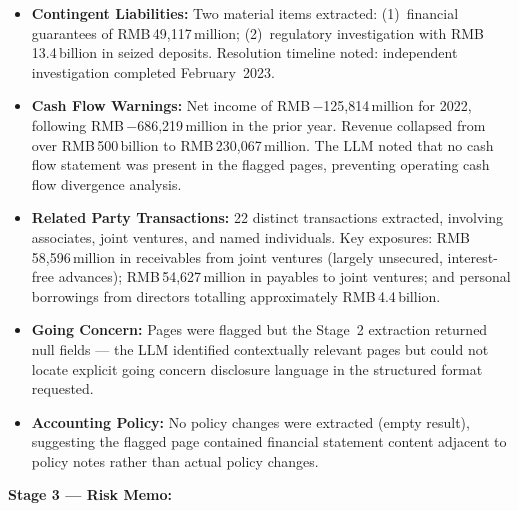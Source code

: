 \documentclass[12pt,a4paper]{article}
\begin{document}
\begin{itemize}[leftmargin=1.5cm]
  \item \textbf{Contingent Liabilities:} Two material items extracted:
    (1)~financial guarantees of RMB\,49,117\,million; (2)~regulatory
    investigation with RMB\,13.4\,billion in seized deposits. Resolution
    timeline noted: independent investigation completed February~2023.

  \item \textbf{Cash Flow Warnings:} Net income of RMB\,$-$125,814\,million
    for 2022, following RMB\,$-$686,219\,million in the prior year.
    Revenue collapsed from over RMB\,500\,billion to RMB\,230,067\,million.
    The LLM noted that no cash flow statement was present in the flagged
    pages, preventing operating cash flow divergence analysis.

  \item \textbf{Related Party Transactions:} 22 distinct transactions extracted,
    involving associates, joint ventures, and named individuals.
    Key exposures: RMB\,58,596\,million in receivables from joint ventures
    (largely unsecured, interest-free advances); RMB\,54,627\,million in
    payables to joint ventures; and personal borrowings from
    directors totalling approximately RMB\,4.4\,billion.

  \item \textbf{Going Concern:} Pages were flagged but the Stage~2 extraction
    returned null fields --- the LLM identified contextually relevant pages
    but could not locate explicit going concern disclosure language in the
    structured format requested.

  \item \textbf{Accounting Policy:} No policy changes were extracted (empty
    result), suggesting the flagged page contained financial statement
    content adjacent to policy notes rather than actual policy changes.
\end{itemize}

\textbf{Stage 3 --- Risk Memo:}
\end{document}
